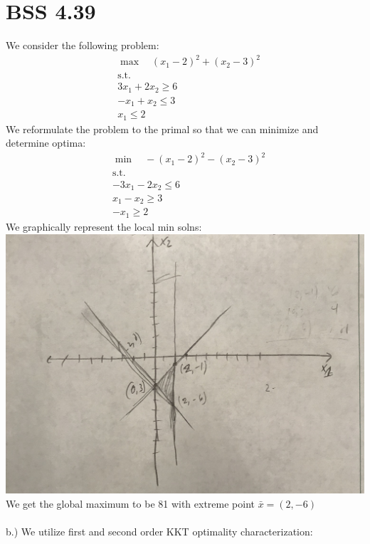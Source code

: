 \documentclass[12pt]{article}
\begin{document}
\section{BSS 4.39} 
We consider the following problem:\\
    \begin{align*}
        &\max \quad (x_1 -2)^2 + (x_2 - 3)^2\\
        &\text{s.t.}\\
        &3x_1 + 2x_2 \geq 6\\
        &-x_1 + x_2 \leq 3\\
        & x_1 \leq 2
    \end{align*}
We reformulate the problem to the primal so that we can minimize and determine optima: \\ 
    \begin{align*}
        &\min \quad -(x_1-2)^2 - (x_2-3)^2 \\
        &\text{s.t.}\\
        & -3x_1 - 2x_2 \leq 6 \\ 
        & x_1 - x_2 \geq 3\\
        &-x_1 \geq 2
    \end{align*}
We graphically represent the local min solns: \\
\includegraphics[width=\textwidth]{BSS4-39.jpeg}\\
We get the global maximum to be 81 with extreme point $\bar x = (2 , -6) $\\ \\
b.) We utilize first and second order KKT optimality characterization:\\
\end{document}
